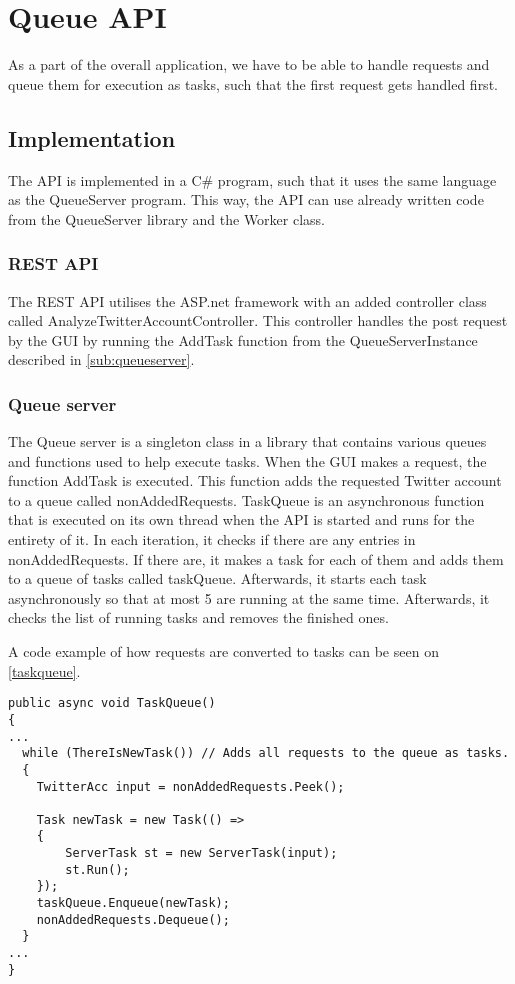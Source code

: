 \chapter{Queue \ac{API}}\label{queueAPI}
As a part of the overall application, we have to be able to handle requests
and queue them for execution as tasks, such that the first request gets handled
first.

\section{Implementation}
The \ac{API} is implemented in a C\# program, such that it uses the same
language as the QueueServer program. This way, the \ac{API} can use already
written code from the QueueServer library and the Worker class.

\subsection{\ac{REST} \ac{API}}
The \ac{REST} \ac{API} utilises the ASP.net framework with an added controller
class called AnalyzeTwitterAccountController. This controller handles the post
request by the GUI by running the AddTask function from the QueueServerInstance
described in \autoref{sub:queueserver}.

\subsection{Queue server} \label{sub:queueserver}
The Queue server is a singleton class in a library that contains various queues
and functions used to help execute tasks. When the GUI makes a request, the
function AddTask is executed. This function adds the requested Twitter account
to a queue called nonAddedRequests. TaskQueue is an asynchronous function that
is executed on its own thread when the \ac{API} is started and runs for the
entirety of it. In each iteration, it checks if there are any entries in
nonAddedRequests. If there are, it makes a task for each of them and adds them
to a queue of tasks called taskQueue. Afterwards, it starts each task
asynchronously so that at most 5 are running at the same time. Afterwards, it
checks the list of running tasks and removes the finished ones. \nl

A code example of how requests are converted to tasks can be seen on
\autoref{taskqueue}. \\

\begin{minipage}[H]{\linewidth}
\begin{lstlisting}[caption = Adding tasks to the queue, label = taskqueue] 
public async void TaskQueue()
{
...
  while (ThereIsNewTask()) // Adds all requests to the queue as tasks.
  {
	TwitterAcc input = nonAddedRequests.Peek();
	
	Task newTask = new Task(() =>
	{
	    ServerTask st = new ServerTask(input);
	    st.Run();
	});
	taskQueue.Enqueue(newTask);
	nonAddedRequests.Dequeue();
  }
...  
}

\end{lstlisting}
\end{minipage}

